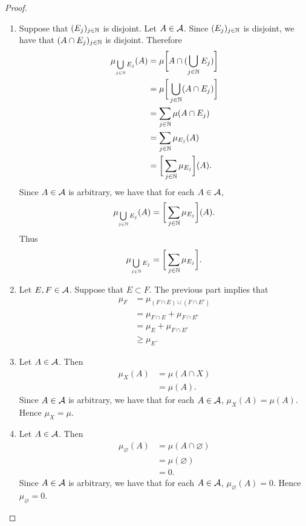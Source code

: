 \documentclass{book}
\begin{document}
	\begin{proof}\
		\begin{enumerate}
			\item Suppose that $(E_j)_{j \in \mathbb{N}}$ is disjoint. Let $A \in \mathcal{A}$. Since $(E_j)_{j \in \mathbb{N}}$ is disjoint, we have that $(A \cap E_j)_{j \in \mathbb{N}}$ is disjoint. Therefore
			\begin{align*}
				\mu_{\bigcup\limits_{j \in \mathbb{N}} E_j}(A)
				& = \mu \bigg[ A \cap (\bigcup_{j \in \mathbb{N}} E_j) \bigg] \\
				& = \mu \bigg[ \bigcup_{j \in \mathbb{N}}(A \cap E_j) \bigg] \\
				& = \sum_{j \in \mathbb{N}} \mu(A \cap E_j) \\
				& = \sum_{j \in \mathbb{N}} \mu_{E_j}(A) \\
				& = \bigg[ \sum_{j \in \mathbb{N}} \mu_{E_j} \bigg](A).
			\end{align*}
			Since $A \in \mathcal{A}$ is arbitrary, we have that for each $A \in \mathcal{A}$, 
			$$\mu_{\bigcup\limits_{j \in \mathbb{N}} E_j}(A) = \bigg[ \sum_{j \in \mathbb{N}} \mu_{E_j} \bigg](A).$$
			Thus 
			$$\mu_{\bigcup\limits_{j \in \mathbb{N}} E_j} = \bigg[ \sum_{j \in \mathbb{N}} \mu_{E_j} \bigg].$$
			\item Let $E, F \in \mathcal{A}$. Suppose that $E \subset F$. The previous part implies that
			\begin{align*}
				\mu_F
				& = \mu_{(F \cap E) \cup (F \cap E^c)} \\
				& = \mu_{F \cap E} + \mu_{F \cap E^c} \\
				& = \mu_E + \mu_{F \cap E^c} \\
				& \geq \mu_E.
			\end{align*}
			\item Let $A \in \mathcal{A}$. Then 
			\begin{align*}
				\mu_X(A)
				& = \mu(A \cap X) \\
				& = \mu(A).
			\end{align*}
			Since $A \in \mathcal{A}$ is arbitrary, we have that for each $A \in \mathcal{A}$, $\mu_X(A) = \mu(A)$. Hence $\mu_X = \mu$.
			\item Let $A \in \mathcal{A}$. Then 
			\begin{align*}
				\mu_{\varnothing}(A)
				& = \mu(A \cap \varnothing) \\
				& = \mu(\varnothing) \\
				& = 0.
			\end{align*}
			Since $A \in \mathcal{A}$ is arbitrary, we have that for each $A \in \mathcal{A}$, $\mu_{\varnothing}(A) = 0$. Hence $\mu_{\varnothing} = 0$.
		\end{enumerate}
	\end{proof}
\end{document}
